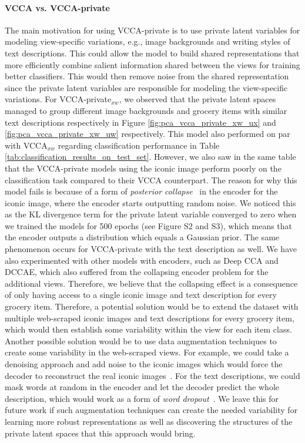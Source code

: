 \paragraph{VCCA vs. VCCA-private} The main motivation for using VCCA-private is to use private latent variables for modeling view-specific variations, e.g., image backgrounds and writing styles of text descriptions. This could allow the model to build shared representations that more efficiently combine salient information shared between the views for training better classifiers. This would then remove noise from the shared representation since the private latent variables are responsible for modeling the view-specific variations. For VCCA-private$_{x w}$, we observed that the private latent spaces managed to group different image backgrounds and grocery items with similar text descriptions respectively in Figure \ref{fig:pca_vcca_private_xw_ux} and \ref{fig:pca_vcca_private_xw_uw} respectively. This model also performed on par with VCCA$_{x w}$ regarding classification performance in Table \ref{tab:classification_results_on_test_set}. However, we also saw in the same table that the VCCA-private models using the iconic image perform poorly on the classification task compared to their VCCA counterpart. The reason for why this model fails is because of a form of \textit{posterior collapse}~\cite{bowman2015generating} in the encoder for the iconic image, where the encoder starts outputting random noise. We noticed this as the KL divergence term for the private latent variable converged to zero when we trained the models for 500 epochs (see Figure S2 and S3), which means that the encoder outputs a distribution which equals a Gaussian prior. The same phenomenon occurs for VCCA-private with the text description as well. We have also experimented with other models with encoders, such as Deep CCA and DCCAE, which also suffered from the collapsing encoder problem for the additional views. Therefore, we believe that the collapsing effect is a consequence of only having access to a single iconic image and text description for every grocery item. Therefore, a potential solution would be to extend the dataset with multiple web-scraped iconic images and text descriptions for every grocery item, which would then establish some variability within the view for each item class. Another possible solution would be to use data augmentation techniques to create some variability in the web-scraped views. For example, we could take a denoising approach and add noise to the iconic images which would force the decoder to reconstruct the real iconic images~\cite{vincent2010stacked}. For the text descriptions, we could mask words at random in the encoder and let the decoder predict the whole description, which would work as a form of \textit{word dropout}~\cite{bowman2015generating, devlin2018bert}. We leave this for future work if such augmentation techniques can create the needed variability for learning more robust representations as well as discovering the structures of the private latent spaces that this approach would bring. 

